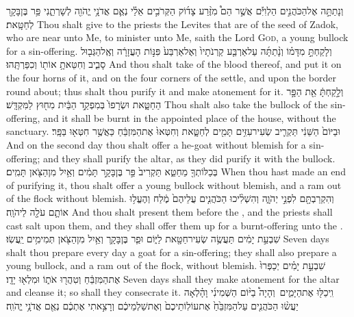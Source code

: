{וְנָתַתָּ֣ה אֶל\maqqaf הַכֹּהֲנִ֣ים הַלְוִיִּ֡ם אֲשֶׁ֣ר הֵם֩ מִזֶּ֨רַע צָד֜וֹק הַקְּרֹבִ֣ים אֵלַ֗י נְאֻ֛ם אֲדֹנָ֥י יֱהֹוִ֖ה לְשָׁרְתֵ֑נִי פַּ֥ר בֶּן\maqqaf בָּקָ֖ר לְחַטָּֽאת׃}
{Thou shalt give to the priests the Levites that are of the seed of Zadok, who are near unto Me, to minister unto Me, saith the Lord \textsc{God}, a young bullock for a sin-offering.}
{וְלָקַחְתָּ֣ מִדָּמ֗וֹ וְנָ֨תַתָּ֜ה עַל\maqqaf אַרְבַּ֤ע קַרְנֹתָיו֙ וְאֶל\maqqaf אַרְבַּע֙ פִּנּ֣וֹת הָעֲזָרָ֔ה וְאֶֽל\maqqaf הַגְּב֖וּל סָבִ֑יב וְחִטֵּאתָ֥ אוֹת֖וֹ וְכִפַּרְתָּֽהוּ׃}
{And thou shalt take of the blood thereof, and put it on the four horns of it, and on the four corners of the settle, and upon the border round about; thus shalt thou purify it and make atonement for it.}
{וְלָ֣קַחְתָּ֔ אֵ֖ת הַפָּ֣ר הַחַטָּ֑את וּשְׂרָפוֹ֙ בְּמִפְקַ֣ד הַבַּ֔יִת מִח֖וּץ לַמִּקְדָּֽשׁ׃}
{Thou shalt also take the bullock of the sin-offering, and it shall be burnt in the appointed place of the house, without the sanctuary.}
{וּבַיּוֹם֙ הַשֵּׁנִ֔י תַּקְרִ֛יב שְׂעִיר\maqqaf עִזִּ֥ים תָּמִ֖ים לְחַטָּ֑את וְחִטְּאוּ֙ אֶת\maqqaf הַמִּזְבֵּ֔חַ כַּאֲשֶׁ֥ר חִטְּא֖וּ בַּפָּֽר׃}
{And on the second day thou shalt offer a he-goat without blemish for a sin-offering; and they shall purify the altar, as they did purify it with the bullock.}
{בְּכַלּוֹתְךָ֖ מֵחַטֵּ֑א תַּקְרִיב֙ פַּ֣ר בֶּן\maqqaf בָּקָ֣ר תָּמִ֔ים וְאַ֥יִל מִן\maqqaf הַצֹּ֖אן תָּמִֽים׃}
{When thou hast made an end of purifying it, thou shalt offer a young bullock without blemish, and a ram out of the flock without blemish.}
{וְהִקְרַבְתָּ֖ם לִפְנֵ֣י יְהֹוָ֑ה וְהִשְׁלִ֨יכוּ הַכֹּהֲנִ֤ים עֲלֵיהֶם֙ מֶ֔לַח וְהֶעֱל֥וּ אוֹתָ֛ם עֹלָ֖ה לַיהֹוָֽה׃}
{And thou shalt present them before the \lord, and the priests shall cast salt upon them, and they shall offer them up for a burnt-offering unto the \lord.}
{שִׁבְעַ֣ת יָמִ֔ים תַּעֲשֶׂ֥ה שְׂעִיר\maqqaf חַטָּ֖את לַיּ֑וֹם וּפַ֧ר בֶּן\maqqaf בָּקָ֛ר וְאַ֥יִל מִן\maqqaf הַצֹּ֖אן תְּמִימִ֥ים יַֽעֲשֽׂוּ׃}
{Seven days shalt thou prepare every day a goat for a sin-offering; they shall also prepare a young bullock, and a ram out of the flock, without blemish.}
{שִׁבְעַ֣ת יָמִ֗ים יְכַפְּרוּ֙ אֶת\maqqaf הַמִּזְבֵּ֔חַ וְטִהֲר֖וּ אֹת֑וֹ וּמִלְא֖וּ יָדָֽו׃}
{Seven days shall they make atonement for the altar and cleanse it; so shall they consecrate it.}
{וִֽיכַלּ֖וּ אֶת\maqqaf הַיָּמִ֑ים \setuma  וְהָיָה֩ בַיּ֨וֹם הַשְּׁמִינִ֜י וָהָ֗לְאָה יַעֲשׂ֨וּ הַכֹּהֲנִ֤ים עַל\maqqaf הַמִּזְבֵּ֙חַ֙ אֶת\maqqaf עוֹלֽוֹתֵיכֶם֙ וְאֶת\maqqaf שַׁלְמֵיכֶ֔ם וְרָצִ֣אתִי אֶתְכֶ֔ם נְאֻ֖ם אֲדֹנָ֥י יֱהֹוִֽה׃ \setuma }
